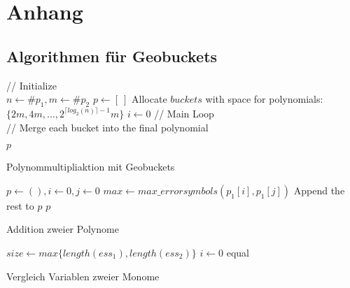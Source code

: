 \chapter{Anhang}

\section*{Algorithmen für Geobuckets}
\begin{algorithm}
\SetAlgoLined
{}
// Initialize \\
$n \gets \#p_1, m\gets \#p_2$ \;
$p \gets [\ ]$ \;
Allocate $buckets$ with space for polynomials: $\{2m, 4m, ..., 2^{\lceil log_2(n)\rceil -1 }m\}$\;
$i\gets 0 $\;
// Main Loop \\
// Merge each bucket into the final polynomial\\


\Return $p$

 \caption{Polynommultipliaktion mit Geobuckets}
 \label{algo:mult}
\end{algorithm}


\begin{algorithm}[H]
\SetAlgoLined
\label{algo:add}
$p \gets (), i \gets 0, j \gets 0$ \; 
 {
    $max \gets max\_errorsymbols(p_1[i], p_1[j])$ \;
}
Append the rest to $p$\;
\Return $p$

 \caption{Addition zweier Polynome}
\end{algorithm}


\begin{algorithm}[H]
\label{algo:maxes}
\SetAlgoLined
{}
$size \gets max\{length(ess_1), length(ess_2)\}$\; 
$i \gets 0 $ \;
\Return equal
 \caption{Vergleich Variablen zweier Monome}
\end{algorithm}


